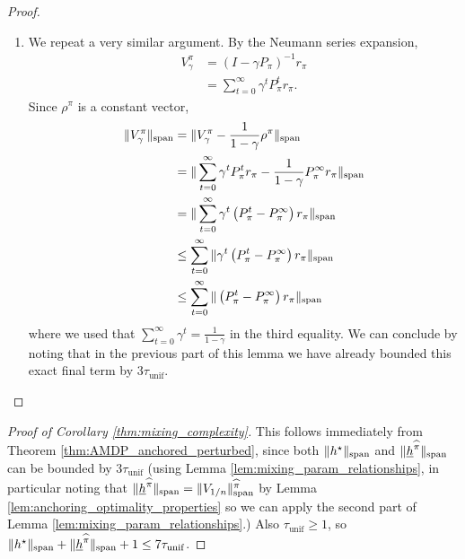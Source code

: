 \documentclass{article}
\theoremstyle{plain}
\theoremstyle{plain}
\theoremstyle{remark}
\theoremstyle{plain}
\theoremstyle{plain}
\newcommand{\pihat}{\widehat{\pi}}
\newcommand{\tmix}{\tau_{\mathrm{unif}}}
\newcommand{\hanc}{\underline{h}}
\begin{document}
\begin{proof}
\begin{enumerate}
        \item We repeat a very similar argument. By the Neumann series expansion,
        \begin{align*}
            V_\gamma^\pi &= (I - \gamma P_\pi)^{-1}r_\pi \\
            &= \sum_{t=0}^\infty \gamma^t P_\pi^t r_\pi.
        \end{align*}
        Since $\rho^\pi$ is a constant vector,
        \begin{align*}
            \Vert V_\gamma^\pi\Vert _{\textnormal{span}} &= \Vert V_\gamma^\pi - \frac{1}{1-\gamma} \rho^\pi\Vert _{\textnormal{span}} \\
            &= \Vert  \sum_{t=0}^\infty \gamma^t P_\pi^t r_\pi  - \frac{1}{1-\gamma} P_\pi^\infty r_\pi\Vert _{\textnormal{span}} \\
            &= \Vert  \sum_{t=0}^\infty \gamma^t\left( P_\pi^t   - P_\pi^\infty \right) r_\pi\Vert _{\textnormal{span}} \\
            &\leq \sum_{t=0}^\infty \Vert   \gamma^t\left( P_\pi^t   - P_\pi^\infty \right) r_\pi\Vert _{\textnormal{span}} \\
            &\leq \sum_{t=0}^\infty \Vert   \left( P_\pi^t   - P_\pi^\infty \right) r_\pi\Vert _{\textnormal{span}}
        \end{align*}
        where we used that $\sum_{t=0}^\infty \gamma^t =\frac{1}{1-\gamma}$ in the third equality. We can conclude by noting that in the previous part of this lemma we have already bounded this exact final term by $3 \tmix$.
    \end{enumerate}
\end{proof}


\begin{proof}[Proof of Corollary \ref{thm:mixing_complexity}]
    This follows immediately from Theorem \ref{thm:AMDP_anchored_perturbed}, since both $\Vert h^\star\Vert _{\textnormal{span}}$ and $\spannorm{\hanc^{\pihat}}$ can be bounded by $3 \tmix$ (using Lemma \ref{lem:mixing_param_relationships}, in particular noting that $\spannorm{\hanc^{\pihat}} = \spannorm{V_{1/n}}^{\pihat}$ by Lemma \ref{lem:anchoring_optimality_properties} so we can apply the second part of Lemma \ref{lem:mixing_param_relationships}.) Also $\tmix \geq 1$, so $\spannorm{h^\star} + \spannorm{\hanc^{\pihat}} + 1 \leq 7 \tmix$.
\end{proof}
\end{document}
